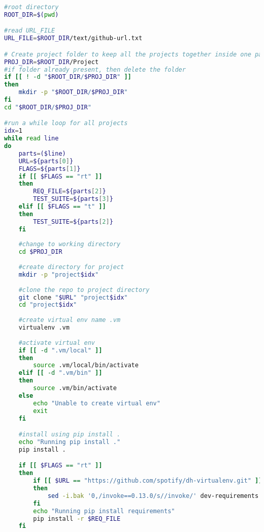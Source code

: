 \lstset{numbers=left, numberstyle=\tiny, stepnumber=1, numbersep=5pt, columns=flexible, breaklines=true, numberblanklines=false}
\lstset{basicstyle=\ttfamily}
\lstset{frame=tb}

\begin{lstlisting}[caption=Bash Script for Project Selection.,label=code:project_selection_automation.sh,language=Bash]
#root directory
ROOT_DIR=$(pwd)

#read URL_FILE
URL_FILE=$ROOT_DIR/text/github-url.txt

# Create project folder to keep all the projects together inside one parent folder
PROJ_DIR=$ROOT_DIR/Project
#if folder already present, then delete the folder
if [[ ! -d "$ROOT_DIR/$PROJ_DIR" ]]
then
    mkdir -p "$ROOT_DIR/$PROJ_DIR" 
fi
cd "$ROOT_DIR/$PROJ_DIR"

#run a while loop for all projects
idx=1
while read line
do
    parts=($line)
    URL=${parts[0]}
    FLAGS=${parts[1]}
    if [[ $FLAGS == "rt" ]]
    then
        REQ_FILE=${parts[2]}
        TEST_SUITE=${parts[3]}
    elif [[ $FLAGS == "t" ]]
    then
        TEST_SUITE=${parts[2]}
    fi
    
    #change to working directory
    cd $PROJ_DIR
    
    #create directory for project
    mkdir -p "project$idx"
    
    #clone the repo to project directory
    git clone "$URL" "project$idx"
    cd "project$idx"
    
    #create virtual env name .vm
    virtualenv .vm
    
    #activate virtual env
    if [[ -d ".vm/local" ]]
    then
        source .vm/local/bin/activate
    elif [[ -d ".vm/bin" ]]
    then
        source .vm/bin/activate
    else
        echo "Unable to create virtual env"
        exit
    fi

    #install using pip install . 
    echo "Running pip install ."
    pip install .

    if [[ $FLAGS == "rt" ]]
    then
        if [[ $URL == "https://github.com/spotify/dh-virtualenv.git" ]]
        then
            sed -i.bak '0,/invoke==0.13.0/s//invoke/' dev-requirements.txt  #fix for dependency conflict issue
        fi
        echo "Running pip install requirements"
        pip install -r $REQ_FILE
    fi


\end{lstlisting}
